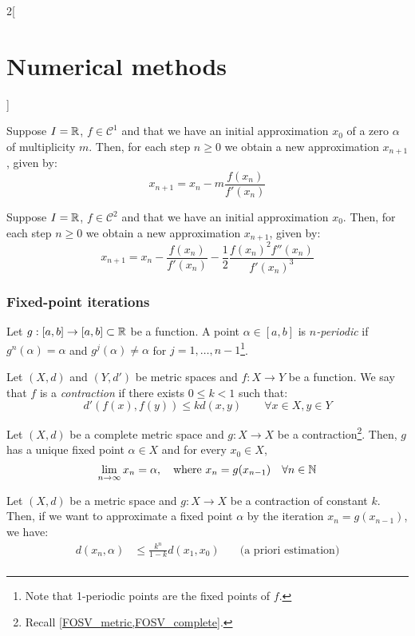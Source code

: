 \documentclass[../../../main.tex]{subfiles}
\begin{document}
\begin{multicols}{2}[\section{Numerical methods}]
\begin{method}
  \end{method}
  \begin{method}
    Suppose $I=\mathbb{R}$, $f\in\mathcal{C}^1$ and that we have an initial approximation $x_0$ of a zero $\alpha$ of multiplicity $m$. Then, for each step $n\geq 0$ we obtain a new approximation $x_{n+1}$, given by: $$x_{n+1}=x_n-m\frac{f(x_n)}{f'(x_n)}$$
  \end{method}
  \begin{method}
    Suppose $I=\mathbb{R}$, $f\in\mathcal{C}^2$ and that we have an initial approximation $x_0$. Then, for each step $n\geq 0$ we obtain a new approximation $x_{n+1}$, given by: $$x_{n+1}=x_n-\frac{f(x_n)}{f'(x_n)}-\frac{1}{2}\frac{{f(x_n)}^2f''(x_n)}{{f'(x_n)}^3}$$
  \end{method}
  \subsubsection{Fixed-point iterations}
  \begin{definition}
    Let $g:[a,b]\rightarrow[a,b]\subset\mathbb{R}$ be a function. A point $\alpha\in[a,b]$ is \emph{$n$-periodic} if $g^n(\alpha)=\alpha$ and $g^j(\alpha)\ne\alpha$ for $j=1,\ldots,n-1$\footnote{Note that 1-periodic points are the fixed points of $f$.}.
  \end{definition}
  \begin{definition}
    Let $(X,d)$ and $(Y,d')$  be metric spaces and $f:X\rightarrow Y$ be a function. We say that $f$ is a \emph{contraction} if there exists $0\leq k<1$ such that: $$d'(f(x),f(y))\leq kd(x,y)\qquad\forall x\in X,y\in Y$$
  \end{definition}
  \begin{theorem}
    Let $(X,d)$ be a complete metric space and $g:X\rightarrow X$ be a contraction\footnote{Recall \cref{FOSV_metric,FOSV_complete}.}. Then, $g$ has a unique fixed point $\alpha\in X$ and for every $x_0\in X$, $$\lim_{n\to\infty}x_n=\alpha,\quad\text{where }x_n=g(x_{n-1})\quad\forall n\in\mathbb{N}$$
  \end{theorem}
  \begin{proposition}
    Let $(X,d)$ be a metric space and $g:X\rightarrow X$ be a contraction of constant $k$. Then, if we want to approximate a fixed point $\alpha$ by the iteration $x_n=g(x_{n-1})$, we have:
    \begin{align*}
      d(x_n,\alpha) & \leq\frac{k^n}{1-k}d(x_1,x_0)\quad   & \text{(a priori estimation)}     \\

\end{align*}
\end{proposition}
\end{multicols}
\end{document}
